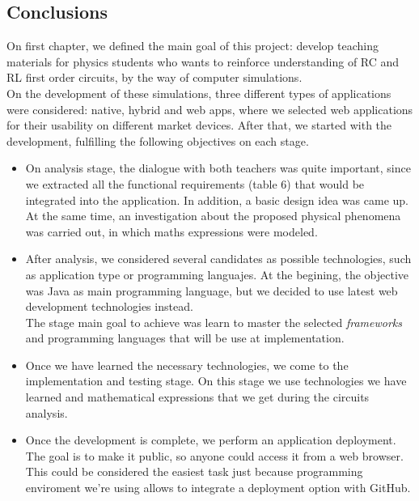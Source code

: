 \documentclass[../main.tex]{subfiles}
\begin{document}
\subsection{Conclusions}
On first chapter, we defined the main goal of this project: develop teaching materials for physics students who wants to reinforce understanding of RC and RL first order circuits, by the way of computer simulations.\\ 

On the development of these simulations, three different types of applications were considered: native, hybrid and web apps, where we selected web applications for their usability on different market devices. After that, we started with the development, fulfilling the following objectives on each stage.

\begin{itemize}
    \item On analysis stage, the dialogue with both teachers was quite important, since we extracted all the functional requirements (table 6) that would be integrated into the application. In addition, a  basic design idea was came up. \\
    
    At the same time, an investigation about the proposed physical phenomena was carried out, in which maths expressions were modeled.

    \item After analysis, we considered several candidates as possible technologies, such as application type or programming languajes. At the begining, the objective was Java as main programming language, but we decided to use latest web development technologies instead.\\ 
    
    The stage main goal to achieve was learn to master the selected \textit{frameworks} and programming languages that will be use at implementation.

    \item Once we have learned the necessary technologies, we come to the implementation and testing stage. On this stage we use technologies we have learned and mathematical expressions that we get during the circuits analysis.
    
    \item Once the development is complete, we perform an application deployment. The goal is to make it public, so anyone could access it from a web browser. This could be considered the easiest task just because programming enviroment we're using allows to integrate a deployment option with GitHub.
    


\end{itemize}
\end{document}
